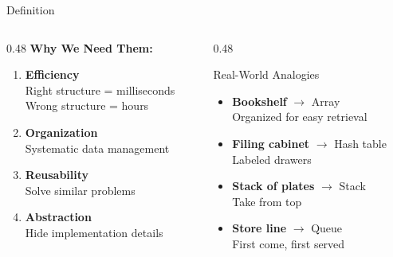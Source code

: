 \documentclass[aspectratio=169,xcolor=dvipsnames]{beamer}
\begin{document}
\begin{frame}{Definition}
  \begin{columns}
    \begin{column}{0.48\textwidth}
      \textbf{Why We Need Them:}
      \begin{enumerate}
        \item \textbf{Efficiency} \\
              Right structure = milliseconds \\
              Wrong structure = hours
        \item \textbf{Organization} \\
              Systematic data management
        \item \textbf{Reusability} \\
              Solve similar problems
        \item \textbf{Abstraction} \\
              Hide implementation details
      \end{enumerate}
    \end{column}
    \begin{column}{0.48\textwidth}
      \begin{exampleblock}{Real-World Analogies}
        \begin{itemize}
          \item \textbf{Bookshelf} $\rightarrow$ Array \\
                {\small Organized for easy retrieval}
          \item \textbf{Filing cabinet} $\rightarrow$ Hash table \\
                {\small Labeled drawers}
          \item \textbf{Stack of plates} $\rightarrow$ Stack \\
                {\small Take from top}
          \item \textbf{Store line} $\rightarrow$ Queue \\
                {\small First come, first served}
        \end{itemize}
      \end{exampleblock}
    \end{column}
  \end{columns}
\end{frame}
\end{document}
